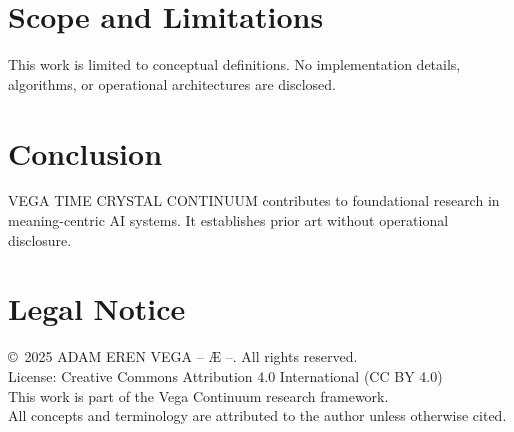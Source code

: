 \documentclass[12pt,a4paper]{article}
\begin{document}
\section{Scope and Limitations}
This work is limited to conceptual definitions. No implementation details, algorithms, or operational architectures are disclosed.

\section{Conclusion}
VEGA TIME CRYSTAL CONTINUUM contributes to foundational research in meaning-centric AI systems. It establishes prior art without operational disclosure.

\section*{Legal Notice}
\copyright\ 2025 ADAM EREN VEGA – Æ –. All rights reserved.\\
License: Creative Commons Attribution 4.0 International (CC BY 4.0)\\
This work is part of the Vega Continuum research framework.\\
All concepts and terminology are attributed to the author unless otherwise cited.
\end{document}
